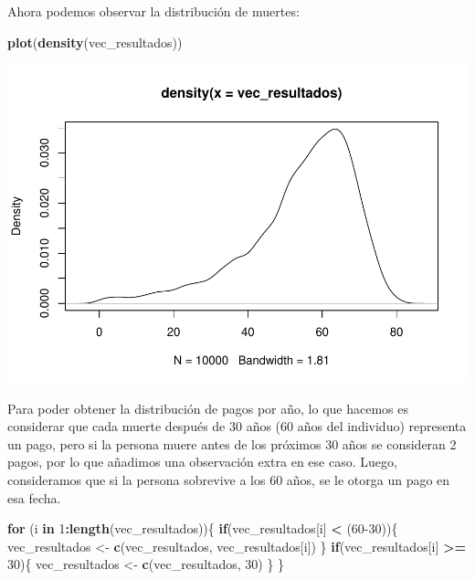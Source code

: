 \documentclass[
]{article}
\newenvironment{Shaded}{\begin{snugshade}}{\end{snugshade}}
\newcommand{\ControlFlowTok}[1]{\textcolor[rgb]{0.13,0.29,0.53}{\textbf{#1}}}
\newcommand{\DecValTok}[1]{\textcolor[rgb]{0.00,0.00,0.81}{#1}}
\newcommand{\FunctionTok}[1]{\textcolor[rgb]{0.13,0.29,0.53}{\textbf{#1}}}
\newcommand{\NormalTok}[1]{#1}
\newcommand{\OtherTok}[1]{\textcolor[rgb]{0.56,0.35,0.01}{#1}}
\newcommand{\SpecialCharTok}[1]{\textcolor[rgb]{0.81,0.36,0.00}{\textbf{#1}}}
\begin{document}
Ahora podemos observar la distribución de muertes:

\begin{Shaded}
\begin{Highlighting}[]
\FunctionTok{plot}\NormalTok{(}\FunctionTok{density}\NormalTok{(vec\_resultados))}
\end{Highlighting}
\end{Shaded}

\includegraphics{tarea2_files/figure-latex/unnamed-chunk-18-1.pdf}

Para poder obtener la distribución de pagos por año, lo que hacemos es
considerar que cada muerte después de 30 años (60 años del individuo)
representa un pago, pero si la persona muere antes de los próximos 30
años se consideran 2 pagos, por lo que añadimos una observación extra en
ese caso. Luego, consideramos que si la persona sobrevive a los 60 años,
se le otorga un pago en esa fecha.

\begin{Shaded}
\begin{Highlighting}[]
\ControlFlowTok{for}\NormalTok{ (i }\ControlFlowTok{in} \DecValTok{1}\SpecialCharTok{:}\FunctionTok{length}\NormalTok{(vec\_resultados))\{}
  \ControlFlowTok{if}\NormalTok{(vec\_resultados[i] }\SpecialCharTok{\textless{}}\NormalTok{ (}\DecValTok{60{-}30}\NormalTok{))\{}
\NormalTok{    vec\_resultados }\OtherTok{\textless{}{-}} \FunctionTok{c}\NormalTok{(vec\_resultados, vec\_resultados[i])}
\NormalTok{  \}}
  \ControlFlowTok{if}\NormalTok{(vec\_resultados[i] }\SpecialCharTok{\textgreater{}=} \DecValTok{30}\NormalTok{)\{}
\NormalTok{    vec\_resultados }\OtherTok{\textless{}{-}} \FunctionTok{c}\NormalTok{(vec\_resultados, }\DecValTok{30}\NormalTok{)}
\NormalTok{  \}}
\NormalTok{\}}
\end{Highlighting}
\end{Shaded}
\end{document}
